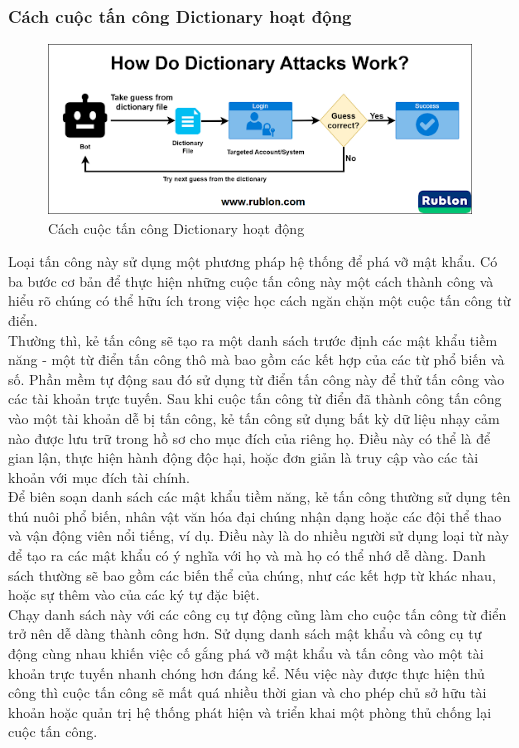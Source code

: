 \subsubsection{ Cách cuộc tấn công Dictionary hoạt động}
\begin{figure}[H]
    \centering
    \includegraphics[scale=0.6]{pic/dictionary.png}
    \caption{Cách cuộc tấn công Dictionary hoạt động}
\end{figure}
Loại tấn công này sử dụng một phương pháp hệ thống để phá vỡ mật khẩu. Có ba bước cơ bản để thực hiện những cuộc tấn công này một cách thành công và hiểu rõ chúng có thể hữu ích trong việc học cách ngăn chặn một cuộc tấn công từ điển.\\

Thường thì, kẻ tấn công sẽ tạo ra một danh sách trước định các mật khẩu tiềm năng - một từ điển tấn công thô mà bao gồm các kết hợp của các từ phổ biến và số.
Phần mềm tự động sau đó sử dụng từ điển tấn công này để thử tấn công vào các tài khoản trực tuyến.\cite{bovsnjak2018brute}
Sau khi cuộc tấn công từ điển đã thành công tấn công vào một tài khoản dễ bị tấn công, kẻ tấn công sử dụng bất kỳ dữ liệu nhạy cảm nào được lưu trữ trong hồ sơ cho mục đích của riêng họ. Điều này có thể là để gian lận, thực hiện hành động độc hại, hoặc đơn giản là truy cập vào các tài khoản với mục đích tài chính.\\

Để biên soạn danh sách các mật khẩu tiềm năng, kẻ tấn công thường sử dụng tên thú nuôi phổ biến, nhân vật văn hóa đại chúng nhận dạng hoặc các đội thể thao và vận động viên nổi tiếng, ví dụ. Điều này là do nhiều người sử dụng loại từ này để tạo ra các mật khẩu có ý nghĩa với họ và mà họ có thể nhớ dễ dàng. Danh sách thường sẽ bao gồm các biến thể của chúng, như các kết hợp từ khác nhau, hoặc sự thêm vào của các ký tự đặc biệt.\\

Chạy danh sách này với các công cụ tự động cũng làm cho cuộc tấn công từ điển trở nên dễ dàng thành công hơn. Sử dụng danh sách mật khẩu và công cụ tự động cùng nhau khiến việc cố gắng phá vỡ mật khẩu và tấn công vào một tài khoản trực tuyến nhanh chóng hơn đáng kể. Nếu việc này được thực hiện thủ công thì cuộc tấn công sẽ mất quá nhiều thời gian và cho phép chủ sở hữu tài khoản hoặc quản trị hệ thống phát hiện và triển khai một phòng thủ chống lại cuộc tấn công.\\

